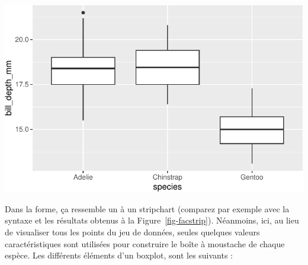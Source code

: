 \documentclass[
  a4paper,
  DIV=11,
  numbers=noendperiod,
  oneside]{scrreprt}
\begin{document}
\includegraphics{03-visualization_files/figure-pdf/unnamed-chunk-72-1.pdf}

Dans la forme, ça ressemble un à un stripchart (comparez par exemple
avec la syntaxe et les résultats obtenus à la
Figure~\ref{fig-facstrip}). Néanmoins, ici, au lieu de visualiser tous
les points du jeu de données, seules quelques valeurs caractéristiques
sont utilisées pour construire le boîte à moustache de chaque espèce.
Les différents éléments d'un boxplot, sont les suivants :
\end{document}
